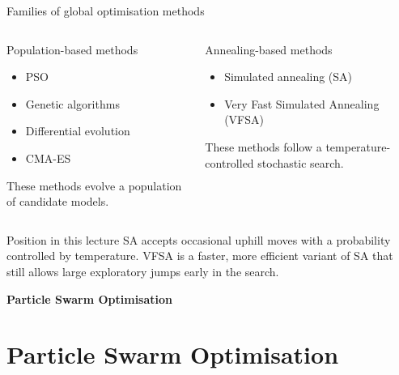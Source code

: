 \documentclass[aspectratio=169]{beamer}
\begin{document}
\begin{frame}{Families of global optimisation methods}
\small

\begin{columns}[T]
\begin{block}{Population-based methods}
\begin{itemize}
    \item[--] \alert{PSO}
    \item[--] Genetic algorithms
    \item[--] Differential evolution
    \item[--] CMA-ES
\end{itemize}
These methods evolve a \alert{population of candidate models}.
\end{block}

\begin{block}{Annealing-based methods}
\begin{itemize}
    \item[--] Simulated annealing (SA)
    \item[--] \alert{Very Fast Simulated Annealing (VFSA)}
\end{itemize}
These methods follow a \alert{temperature-controlled stochastic search}.
\end{block}
\end{columns}

\begin{alertblock}{Position in this lecture}
SA accepts occasional uphill moves with a probability controlled by temperature. VFSA is a faster, more efficient variant of SA that still allows large exploratory jumps early in the search.
\end{alertblock}
\end{frame}

\begin{frame}[plain]
\centering
\vfill
{\LARGE\textbf{Particle Swarm Optimisation}}
\vfill
\end{frame}

\section{Particle Swarm Optimisation}
\end{document}

